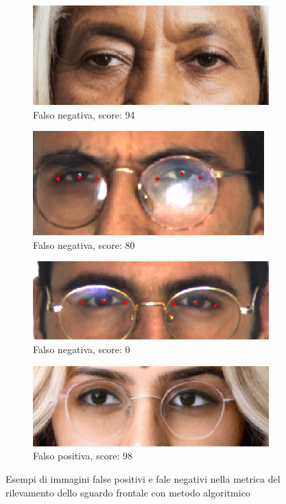 \documentclass[12pt,a4paper,openright,twoside]{book}
\begin{document}
\begin{figure}[htbp]
    \centering
    \begin{subfigure}{0.49\textwidth}
        \centering
        \includegraphics[width=.7\linewidth]{figures/frontal-gaze-algo-false-negative-94-1.png}
        \caption{Falso negativa, score: 94}
        \label{fig:frontal_gaze_algo_weakness_1}
    \end{subfigure}
    \hfill
    \begin{subfigure}{0.49\textwidth}
        \centering
        \includegraphics[width=.7\linewidth]{figures/frontal-gaze-algo-false-negative-80-2.png}
        \caption{Falso negativa, score: 80}
        \label{fig:frontal_gaze_algo_weakness_2}
    \end{subfigure}
    \begin{subfigure}{0.49\textwidth}
        \centering
        \includegraphics[width=.7\linewidth]{figures/frontal-gaze-algo-false-negative-0-3.png}
        \caption{Falso negativa, score: 0}
        \label{fig:frontal_gaze_algo_weakness_3}
    \end{subfigure}
    \begin{subfigure}{0.49\textwidth}
        \centering
        \includegraphics[width=.7\linewidth]{figures/frontal-gaze-algo-false-positive-98-1.png}
        \caption{Falso positiva, score: 98}
        \label{fig:frontal_gaze_algo_weakness_4}
    \end{subfigure}
    \label{fig:frontal_gaze_algo_weakness}
    \caption{Esempi di immagini false positivi e fale negativi nella metrica del rilevamento dello sguardo frontale con metodo algoritmico}
\end{figure}
\end{document}
